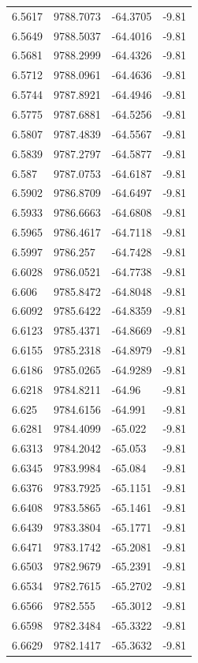 \begin{table}[H]
\begin{tabular}{llll}
6.5617 & 9788.7073 & -64.3705 & -9.81 \\
6.5649 & 9788.5037 & -64.4016 & -9.81 \\
6.5681 & 9788.2999 & -64.4326 & -9.81 \\
6.5712 & 9788.0961 & -64.4636 & -9.81 \\
6.5744 & 9787.8921 & -64.4946 & -9.81 \\
6.5775 & 9787.6881 & -64.5256 & -9.81 \\
6.5807 & 9787.4839 & -64.5567 & -9.81 \\
6.5839 & 9787.2797 & -64.5877 & -9.81 \\
6.587 & 9787.0753 & -64.6187 & -9.81 \\
6.5902 & 9786.8709 & -64.6497 & -9.81 \\
6.5933 & 9786.6663 & -64.6808 & -9.81 \\
6.5965 & 9786.4617 & -64.7118 & -9.81 \\
6.5997 & 9786.257 & -64.7428 & -9.81 \\
6.6028 & 9786.0521 & -64.7738 & -9.81 \\
6.606 & 9785.8472 & -64.8048 & -9.81 \\
6.6092 & 9785.6422 & -64.8359 & -9.81 \\
6.6123 & 9785.4371 & -64.8669 & -9.81 \\
6.6155 & 9785.2318 & -64.8979 & -9.81 \\
6.6186 & 9785.0265 & -64.9289 & -9.81 \\
6.6218 & 9784.8211 & -64.96 & -9.81 \\
6.625 & 9784.6156 & -64.991 & -9.81 \\
6.6281 & 9784.4099 & -65.022 & -9.81 \\
6.6313 & 9784.2042 & -65.053 & -9.81 \\
6.6345 & 9783.9984 & -65.084 & -9.81 \\
6.6376 & 9783.7925 & -65.1151 & -9.81 \\
6.6408 & 9783.5865 & -65.1461 & -9.81 \\
6.6439 & 9783.3804 & -65.1771 & -9.81 \\
6.6471 & 9783.1742 & -65.2081 & -9.81 \\
6.6503 & 9782.9679 & -65.2391 & -9.81 \\
6.6534 & 9782.7615 & -65.2702 & -9.81 \\
6.6566 & 9782.555 & -65.3012 & -9.81 \\
6.6598 & 9782.3484 & -65.3322 & -9.81 \\
6.6629 & 9782.1417 & -65.3632 & -9.81 \\

\end{tabular}
\end{table}
